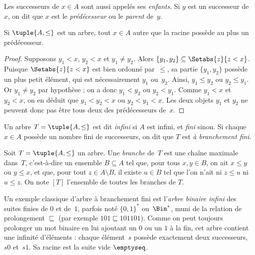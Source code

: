 \documentclass[../../../include/open-logic-section]{subfiles}
\begin{document}
Les successeurs de $x \in A$ sont aussi appelés ses \emph{enfants}.
Si $y$ est un successeur de~$x$, on dit que $x$ est le \emph{prédécesseur}
ou le \emph{parent} de~$y$.

\begin{prop}
Si $\tuple{A,\le}$ est un arbre, tout $x \in A$ autre que la racine
possède au plus un prédécesseur.
\end{prop}

\begin{proof}
Supposons $y_1 < x$, $y_2 < x$ et $y_1 \neq y_2$.
Alors $\{y_1, y_2\} \subseteq \Setabs{z}{z<x}$.
Puisque $\Setabs{z}{z<x}$ est bien ordonné par~$\le$, sa partie
$\{y_1, y_2\}$ possède un plus petit élément, qui est nécessairement
$y_1$ ou~$y_2$. Ainsi, $y_1 \le y_2$ ou $y_2 \le y_1$.
Or $y_1 \neq y_2$ par hypothèse ; on a donc $y_1 < y_2$ ou $y_2 < y_1$.
Comme $y_1 < x$ et $y_2 < x$, on en déduit que $y_1 < y_2 < x$
ou $y_2 < y_1 < x$. Les deux objets $y_1$ et $y_2$ ne peuvent donc
pas être tous deux des prédécesseurs de~$x$.
\end{proof}

\begin{defn}
Un arbre $T = \tuple{A, \le}$ est dit \emph{infini} si $A$ est infini,
et \emph{fini} sinon. Si chaque $x \in A$ possède un nombre fini
de successeurs, on dit que $T$ est \emph{à branchement fini}.
\end{defn}

\begin{defn}[Branches]
Soit $T = \tuple{A, \le}$ un arbre. Une \emph{branche} de~$T$ est une
chaîne maximale dans~$T$, c’est-à-dire un ensemble $B \subseteq A$
tel que, pour tous $x, y \in B$, on ait $x \le y$ ou $y \le x$,
et que, pour tout $z \in A \setminus B$, il existe $u \in B$ tel que
l’on n’ait ni $z \le u$ ni $u \le z$.
%
%
%
On note $[T]$ l’ensemble de toutes les branches de $T$.
\end{defn}

\begin{ex}
Un exemple classique d’arbre à branchement fini est l’\emph{arbre binaire
infini} des suites finies de $0$ et de~$1$, parfois noté $\{0,1\}^*$
ou~$\Bin^*$, muni de la relation de prolongement $\sqsubseteq$
(par exemple $101 \sqsubseteq 101101$). Comme on peut toujours prolonger
un mot binaire en lui ajoutant un $0$ ou un $1$ à la fin, cet arbre
contient une infinité d’éléments : chaque élément~$s$ possède exactement
deux successeurs, $s0$ et~$s1$. Sa racine est la suite vide $\emptyseq$.
\end{ex}
\end{document}
